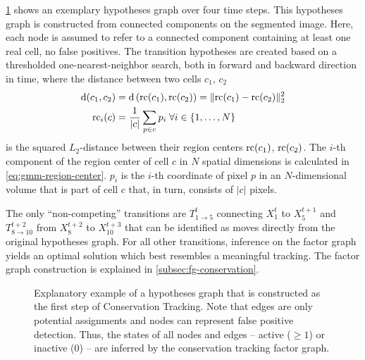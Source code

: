 \cref{fig:gmm-hypotheses-graph-orig} shows an exemplary hypotheses graph over four time steps. This
hypotheses graph is constructed from connected components on the segmented image.  Here, each node
is assumed to refer to a connected component containing at least one real cell, \ie no false
positives. The transition hypotheses are created based on a thresholded one-nearest-neighbor search,
both in forward and backward direction in time, where the distance between two cells $c_1$, $c_2$
\begin{align}
    \label{eq:gmm-region-distance}
    \operatorname{d}(c_1, c_2) &= \operatorname{d}\left(\operatorname{rc}(c_1), \operatorname{rc}(c_2)\right) = \lVert \operatorname{rc}(c_1) - \operatorname{rc}(c_2) \rVert_2^2 \\
    \label{eq:gmm-region-center}
    \operatorname{rc}_i(c) &= \frac{1}{\lvert c \rvert} \sum_{p \in c} p_i \; \forall i\in\{1,\hdots,N\}
\end{align}
is the squared $L_2$-distance between their region centers $\operatorname{rc}(c_1)$, $\operatorname{rc}(c_2)$. The $i$-th
component of the region center of cell $c$ in $N$ spatial dimensions is calculated in
\cref{eq:gmm-region-center}. $p_i$ is the $i$-th coordinate of pixel $p$ in an $N$-dimensional volume that is part
of cell $c$ that, in turn, consists of $\lvert c \rvert$ pixels.

The only ``non-competing'' transitions are $T_{1\to 5}^t$ connecting $X_1^t$ to $X_5^{t+1}$ and
$T_{8\to 10}^{t+2}$ from $X_8^{t+2}$ to $X_{10}^{t+3}$ that can be identified as moves directly from
the original hypotheses graph. For all other transitions, inference on the factor graph yields an
optimal solution which best resembles a meaningful tracking. The factor graph construction is
explained in \cref{subsec:fg-conservation}.


\begin{figure}[h]
    \centering
    \scalebox{0.7}{
        \begin{tikzpicture}[minimum size=58pt,scale=0.45, every node/.style={scale=0.45, font=\LARGE}, thick]
            
        \end{tikzpicture}
    }
    \caption[Original Hypotheses Graph]{Explanatory example of a hypotheses graph that is
        constructed as the first step of Conservation Tracking. Note that edges are only potential
        assignments and nodes can represent false positive detection. Thus, the states of all nodes
        and edges -- active ($\ge 1$) or inactive ($0$) -- are inferred by the conservation tracking
        factor graph. }
    \label{fig:gmm-hypotheses-graph-orig}
\end{figure}

